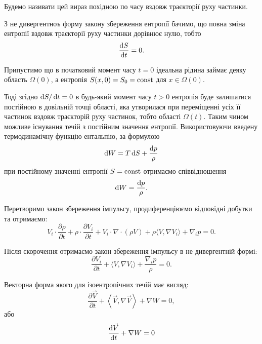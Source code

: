 Будемо називати цей вираз похідною по часу вздовж траєкторії руху частинки. \medskip

З не дивергентноъ форму закону збереження ентропії бачимо, що повна зміна ентропії вздовж траєкторії руху частинки дорівнює нулю, тобто
\begin{equation}
	\frac{\mathop{}\!\mathrm{d} S}{\mathop{}\!\mathrm{d} t} = 0.
\end{equation}

Припустимо що в початковий момент часу $t = 0$ ідеальна рідина займає деяку область $\Omega(0)$, а ентропія $S(x, 0) = S_0 = \operatorname{const}$ для $x \in \Omega(0)$. \medskip
 
Тоді згідно $\mathop{}\!\mathrm{d} S / \mathop{}\!\mathrm{d} t = 0$ в будь-який момент часу $t > 0$ ентропія буде залишатися постійною в довільній точці області, яка утворилася при переміщенні усіх її частинок вздовж траєкторій руху частинок, тобто області $\Omega(t)$. Таким чином можливе існування течій з постійним значення ентропії. Використовуючи введену термодинамічну функцію ентальпію, за формулою
\begin{equation}
	\mathop{}\!\mathrm{d} W = T \mathop{}\!\mathrm{d} S + \frac{\mathop{}\!\mathrm{d} p}{\rho}
\end{equation}
при постійному значенні ентропії $S = \operatorname{const}$ отримаємо співвідношення 
\begin{equation}
	\mathop{}\!\mathrm{d} W = \frac{\mathop{}\!\mathrm{d} p}{\rho}.	
\end{equation}

Перетворимо закон збереження імпульсу, продиференціюємо відповідні добутки та отримаємо:
\begin{equation}
	V_i \cdot \frac{\partial \rho}{\partial t} + \rho \cdot \frac{\partial V_i}{\partial t} + V_i \cdot \nabla \cdot (\rho V) + \rho \langle V, \nabla V_i \rangle + \nabla_i p = 0.
\end{equation}

Після скорочення отримаємо закон збереження імпульсу в не дивергентній формі:
\begin{equation}
	\frac{\partial V_i}{\partial t} + \langle V, \nabla V_i \rangle + \frac{\nabla_i p}{\rho} = 0.
\end{equation}

Векторна форма якого для ізоентропічних течій має вигляд:
\begin{equation}
	\frac{\partial \vec V}{\partial t} + \left\langle \vec V, \nabla \vec V \right\rangle + \nabla W = 0,
\end{equation}
або
\begin{equation}
	\frac{\mathop{}\!\mathrm{d} \vec V}{\mathop{}\!\mathrm{d} t} + \nabla W = 0
\end{equation}


